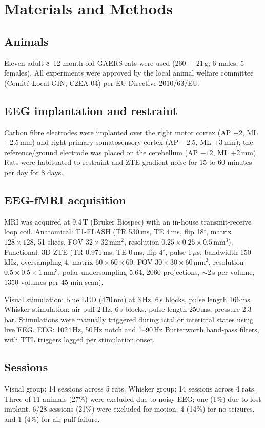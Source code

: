 \documentclass[11pt]{article}
\begin{document}
\section{Materials and Methods}
\subsection{Animals}
Eleven adult 8--12 month-old GAERS rats were used (260 $\pm$ 21\,g; 6 males, 5 females). All experiments were approved by the local animal welfare committee (Comit\'e Local GIN, C2EA-04) per EU Directive 2010/63/EU.

\subsection{EEG implantation and restraint}
Carbon fibre electrodes were implanted over the right motor cortex (AP +2, ML +2.5\,mm) and right primary somatosensory cortex (AP $-2.5$, ML +3\,mm); the reference/ground electrode was placed on the cerebellum (AP $-12$, ML +2\,mm). Rats were habituated to restraint and ZTE gradient noise for 15 to 60 minutes per day for 8 days.

\subsection{EEG-fMRI acquisition}
MRI was acquired at 9.4\,T (Bruker Biospec) with an in-house transmit-receive loop coil. Anatomical: T1-FLASH (TR 530\,ms, TE 4\,ms, flip 18$^\circ$, matrix $128\times128$, 51 slices, FOV $32\times32$\,mm$^2$, resolution $0.25\times0.25\times0.5$\,mm$^3$). Functional: 3D ZTE (TR 0.971\,ms, TE 0\,ms, flip 4$^\circ$, pulse 1\,$\mu$s, bandwidth 150\,kHz, oversampling 4, matrix $60\times60\times60$, FOV $30\times30\times60$\,mm$^3$, resolution $0.5\times0.5\times1$\,mm$^3$, polar undersampling 5.64, 2060 projections, $\sim$2\,s per volume, 1350 volumes per 45-min scan).

Visual stimulation: blue LED (470\,nm) at 3\,Hz, 6\,s blocks, pulse length 166\,ms. Whisker stimulation: air-puff 2\,Hz, 6\,s blocks, pulse length 250\,ms, pressure 2.3\,bar. Stimulations were manually triggered during ictal or interictal states using live EEG. EEG: 1024\,Hz, 50\,Hz notch and 1--90\,Hz Butterworth band-pass filters, with TTL triggers logged per stimulation onset.

\subsection{Sessions}
Visual group: 14 sessions across 5 rats. Whisker group: 14 sessions across 4 rats. Three of 11 animals (27\%) were excluded due to noisy EEG; one (1\%) due to lost implant. 6/28 sessions (21\%) were excluded for motion, 4 (14\%) for no seizures, and 1 (4\%) for air-puff failure.
\end{document}
